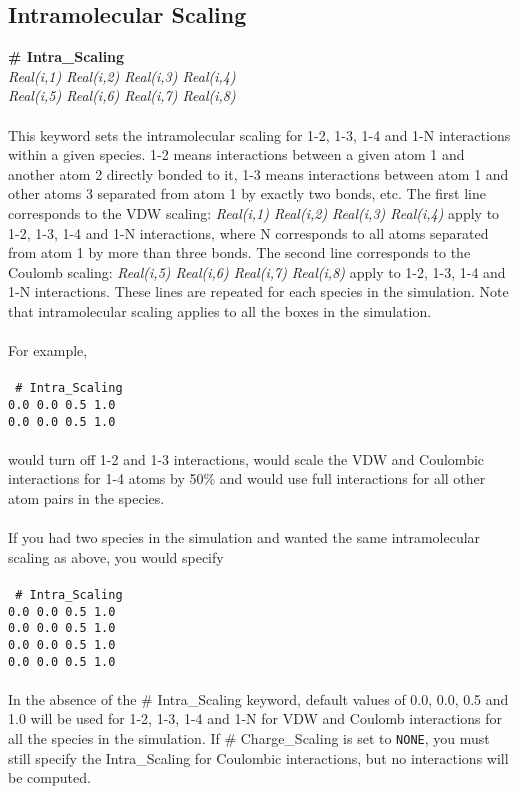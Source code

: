 \subsection{Intramolecular Scaling}\label{sec:Intra_Scaling}
{\bf \# Intra\_Scaling} \\
{\it Real(i,1) Real(i,2) Real(i,3) Real(i,4)} \\ 
{\it Real(i,5) Real(i,6) Real(i,7) Real(i,8)} \\ \\
%
This keyword sets the intramolecular scaling for 1-2, 1-3, 1-4 and 1-N
interactions within a given species. 1-2 means interactions between a
given atom 1 and another atom 2 directly bonded to it, 1-3 means
interactions between atom 1 and other atoms 3 separated from atom 1 by
exactly two bonds, etc. The first line corresponds to the
VDW scaling: {\it Real(i,1) Real(i,2) Real(i,3) Real(i,4)} apply to
1-2, 1-3, 1-4 and 1-N interactions, where N corresponds to all atoms
separated from atom 1 by more than three bonds. 
The second line corresponds to the Coulomb scaling: 
{\it Real(i,5)  Real(i,6) Real(i,7) Real(i,8)} apply to 1-2, 1-3, 1-4
and 1-N interactions. These lines are repeated for
each species in the simulation. Note that intramolecular scaling
applies to all the boxes in the simulation. \\ \\
%
For example, \\ \\
\texttt{
\# Intra\_Scaling \\
0.0 0.0 0.5 1.0 \\
0.0 0.0 0.5 1.0}
\\ \\
would turn off 1-2 and 1-3 interactions, would scale the VDW and
Coulombic interactions for 1-4 atoms by 50\% and would use full
interactions for all other atom pairs in the species. \\ \\
%
If you had two species in the simulation and wanted the same
intramolecular scaling as above, you would specify \\ \\
\texttt{
\# Intra\_Scaling \\
0.0 0.0 0.5 1.0 \\
0.0 0.0 0.5 1.0 \\
0.0 0.0 0.5 1.0 \\
0.0 0.0 0.5 1.0}
\\ \\
In the absence
of the \# Intra\_Scaling keyword, default values of 0.0, 0.0, 0.5 and 1.0 will be used
for 1-2, 1-3, 1-4 and 1-N  for VDW and Coulomb interactions for all
the species in the simulation.  If \# Charge\_Scaling is set to
\texttt{NONE}, you must still specify the Intra\_Scaling for Coulombic
interactions, but no interactions will be computed. \
%
%
%
